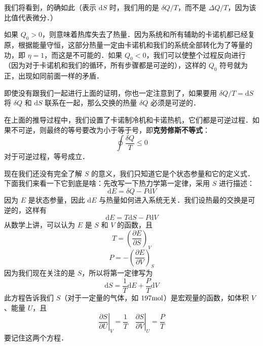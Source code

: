 我们将看到，的确如此（表示 $\mathrm dS $ 时，我们用的是 $\delta Q/T$，而不是 $\Delta Q/T$，因为该比值代表微分．）

如果 $Q_0>0$，则意味着热库失去了热量．因为系统和所有辅助的卡诺机都已经复原，根据能量守恒，这部分热量一定由卡诺机和我们的系统全部转化为了等量的功，即 $\eta=1$，而这是不可能的．如果 $Q_0<0$，我们可以使整个过程反向进行（因为对于卡诺机和我们的循环，所有步骤都是可逆的），这样的 $Q_0$ 符号就为正，出现如同前面一样的矛盾．

即使没有跟我们一起进行上面的证明，你也一定注意到了，如果要用 $\delta Q/T=\mathrm d S$ 将 $\delta Q$ 和 $\mathrm dS$ 联系在一起，那么交换的热量 $\delta Q$ 必须是可逆的．

在上面的推导过程中，我们设置了卡诺制冷机和卡诺热机，它们都是可逆过程．如果不可逆，则最终的等号要改为小于等于号，即\textbf{克劳修斯不等式}：
\begin{equation}
\oint \frac{\delta Q}{T}\le 0
\end{equation}
对于可逆过程，等号成立．



现在我们还没有完全了解 $S$ 的意义，我们只知道它是个状态参量和它的定义式．下面我们来看一下它到底是啥：先改写一下热力学第一定律，采用 $S$ 进行描述：
\begin{equation}
\mathrm d E = \delta{Q} - P\mathrm d V
\end{equation}
因为 $E$ 是状态参量，因此 $\mathrm d E$ 与热量如何进入系统无关．我们设热最的交换是可逆的，这样有
\begin{equation}
\mathrm d E =T\mathrm dS - P\mathrm d V
\end{equation}
从数学上讲，可以认为 $E$ 是 $S $ 和 $V $ 的函数，且
\begin{equation}
T=\left(\frac{\partial E}{\partial S}\right)_V
\end{equation}
\begin{equation}
P=-\left(\frac{\partial E}{\partial V}\right)_S
\end{equation}
因为我们现在关注的是 $S$，所以将第一定律写为
\begin{equation}
\text{d}S=\frac{1}{T}\text{d}E+\frac{P}{T}\text{d}V
\end{equation}
此方程告诉我们 $S$（对于一定量的气体，如 $197 \rm mol$）是宏观量的函数，如体积 $V $、能量 $U$，且
\begin{equation}
\left. \frac{\partial S}{\partial U} \right|_V=\frac{1}{T}\quad \left. \frac{\partial S}{\partial V} \right|_U=\frac{P}{T}
\end{equation}
要记住这两个方程．

